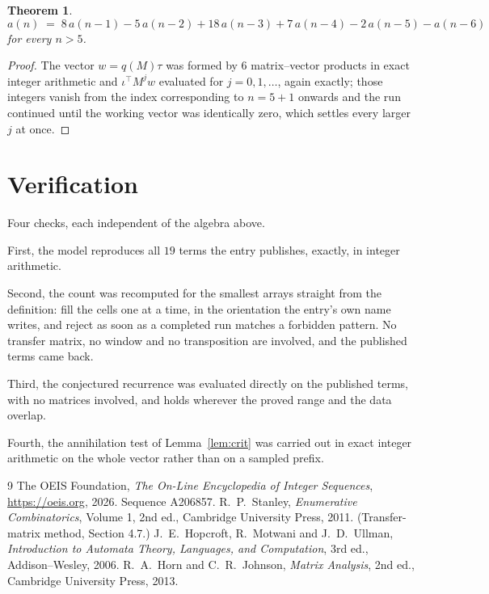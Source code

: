 \documentclass[11pt,a4paper]{article}
\theoremstyle{plain}
\newtheorem{theorem}{Theorem}
\theoremstyle{definition}
\begin{document}
\begin{theorem}
\[
a(n)\;=\;8\,a(n-1) - 5\,a(n-2) + 18\,a(n-3) + 7\,a(n-4) - 2\,a(n-5) - a(n-6)
\]
for every $n>5$.
\end{theorem}

\begin{proof}
The vector $w=q(M)\tau$ was formed by $6$ matrix--vector products in exact integer
arithmetic and $\iota^{\!\top}M^{j}w$ evaluated for $j=0,1,\dots$, again exactly; those
integers vanish from the index corresponding to $n=5+1$ onwards and the run continued
until the working vector was identically zero, which settles every larger $j$ at once.
\end{proof}

\section{Verification}

Four checks, each independent of the algebra above.

First, the model reproduces all $19$ terms the entry publishes, exactly, in integer
arithmetic.

Second, the count was recomputed for the smallest arrays straight from the definition: fill the
cells one at a time, in the orientation the entry's own name writes, and reject as soon as a
completed run matches a forbidden pattern. No transfer matrix, no window and no transposition
are involved, and the published terms came back.

Third, the conjectured recurrence was evaluated directly on the published terms, with no
matrices involved, and holds wherever the proved range and the data overlap.

Fourth, the annihilation test of Lemma~\ref{lem:crit} was carried out in exact integer
arithmetic on the whole vector rather than on a sampled prefix.

\begin{thebibliography}{9}
 The OEIS Foundation, \emph{The On-Line Encyclopedia of Integer
Sequences}, \url{https://oeis.org}, 2026. Sequence A206857.
 R.~P.~Stanley, \emph{Enumerative Combinatorics}, Volume 1, 2nd ed.,
Cambridge University Press, 2011. (Transfer-matrix method, Section 4.7.)
 J.~E.~Hopcroft, R.~Motwani and J.~D.~Ullman, \emph{Introduction to Automata
Theory, Languages, and Computation}, 3rd ed., Addison--Wesley, 2006.
 R.~A.~Horn and C.~R.~Johnson, \emph{Matrix Analysis}, 2nd ed., Cambridge
University Press, 2013.
\end{thebibliography}
\end{document}
